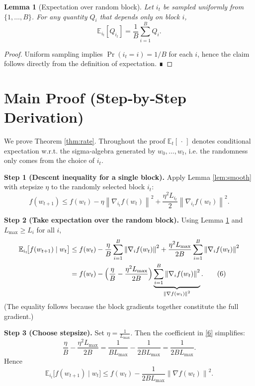 \documentclass{article}
\newtheorem{lemma}{Lemma}
\newcommand{\E}{\mathbb{E}}
\newcommand{\norm}[1]{\left\lVert #1\right\rVert}
\begin{document}
\begin{lemma}[Expectation over random block]\label{lem:expect}
Let $i_{t}$ be sampled uniformly from $\{1,\dots ,B\}$. For any quantity $Q_{i}$ that depends only on block $i$,
\[
\E_{i_{t}}[Q_{i_{t}}]=\frac{1}{B}\sum_{i=1}^{B} Q_{i}.
\tag{4}
\]
\end{lemma}
\begin{proof}
Uniform sampling implies $\Pr(i_{t}=i)=1/B$ for each $i$, hence the claim follows directly from the definition of expectation. ∎
\end{proof}

\section*{Main Proof (Step‑by‑Step Derivation)}
We prove Theorem \ref{thm:rate}.  Throughout the proof $ \E_{t}[\,\cdot\,] $ denotes
conditional expectation w.r.t. the sigma‑algebra generated by $w_{0},\dots ,w_{t}$,
i.e. the randomness only comes from the choice of $i_{t}$.

\noindent\textbf{Step 1 (Descent inequality for a single block).}  
Apply Lemma \ref{lem:smooth} with stepsize $\eta$ to the randomly selected block $i_{t}$:
\[
f(w_{t+1})\le f(w_{t})-\eta \norm{\nabla_{i_{t}}f(w_{t})}^{2}
+\frac{\eta^{2}L_{i_{t}}}{2}\norm{\nabla_{i_{t}}f(w_{t})}^{2}.
\tag{5}
\]

\noindent\textbf{Step 2 (Take expectation over the random block).}  
Using Lemma \ref{lem:expect} and $L_{\max}\ge L_{i}$ for all $i$,
\begin{align}
\E_{i_{t}}\!\bigl[f(w_{t+1})\mid w_{t}\bigr]
&\le f(w_{t})-\frac{\eta}{B}\sum_{i=1}^{B}\norm{\nabla_{i}f(w_{t})}^{2}
+\frac{\eta^{2}L_{\max}}{2B}\sum_{i=1}^{B}\norm{\nabla_{i}f(w_{t})}^{2} \nonumber\\
&= f(w_{t})-\Bigl(\frac{\eta}{B}-\frac{\eta^{2}L_{\max}}{2B}\Bigr)
\underbrace{\sum_{i=1}^{B}\norm{\nabla_{i}f(w_{t})}^{2}}_{\norm{\nabla f(w_{t})}^{2}} .
\tag{6}
\end{align}
(The equality follows because the block gradients together constitute the full gradient.)

\noindent\textbf{Step 3 (Choose stepsize).}  
Set $\displaystyle \eta=\frac{1}{L_{\max}}$.  Then the coefficient in \eqref{6} simplifies:
\[
\frac{\eta}{B}-\frac{\eta^{2}L_{\max}}{2B}
= \frac{1}{B L_{\max}}-\frac{1}{2B L_{\max}}
= \frac{1}{2B L_{\max}} .
\tag{7}
\]
Hence
\[
\E_{i_{t}}\!\bigl[f(w_{t+1})\mid w_{t}\bigr]
\le f(w_{t})-\frac{1}{2B L_{\max}}\norm{\nabla f(w_{t})}^{2}.
\tag{8}
\]
\end{document}
